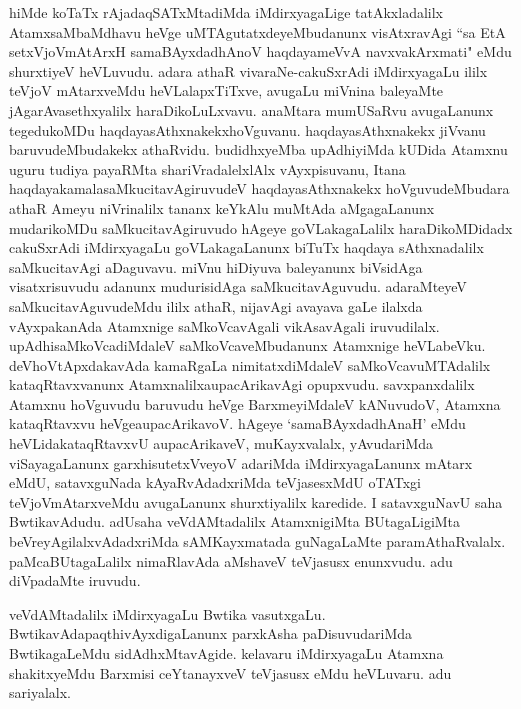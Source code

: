 \begin{artha}
hiMde koTaTx rAjadaqSATxMtadiMda iMdirxyagaLige tatAkxladalilx AtamxsaMbaMdhavu heVge uMTAgutatxdeyeMbudanunx visAtxravAgi ``sa EtA setxVjoVmAtArxH samaBAyxdadhAnoV haqdayameVvA navxvakArxmati" eMdu shurxtiyeV heVLuvudu. adara athaR vivaraNe-cakuSxrAdi iMdirxyagaLu ililx teVjoV mAtarxveMdu heVLalapxTiTxve, avugaLu miVnina baleyaMte jAgarAvasethxyalilx haraDikoLuLxvavu. anaMtara mumUSaRvu avugaLanunx tegedukoMDu haqdayasAthxnakekx\break hoVguvanu. haqdayasAthxnakekx jiVvanu baruvudeMbudakekx athaRvidu. budidhxyeMba upAdhiyiMda kUDida Atamxnu uguru tudiya payaRMta shariVradalelxlAlx vAyxpisuvanu, Itana haqdayakamala\break saMkucitavAgiruvudeV haqdayasAthxnakekx hoVguvudeMbudara athaR Ameyu niVrinalilx tananx keYkAlu muMtAda aMgagaLanunx mudari\-koMDu saMkucitavAgiruvudo hAgeye goVLakagaLalilx haraDikoMDidadx cakuSxrAdi iMdirxyagaLu goVLakagaLanunx biTuTx haqdaya sAthxnadalilx saMkucitavAgi aDaguvavu. miVnu hiDiyuva baleyanunx biVsidAga visatxrisuvudu adanunx mudurisidAga saMkucitavAguvudu. adaraMteyeV saMkucitavAguvudeMdu ililx athaR, nijavAgi avayava gaLe ilalxda vAyxpakanAda Atamxnige saMkoVcavAgali vikAsavAgali iruvudilalx. upAdhisaMkoVcadiMdaleV saMkoVcaveMbudanunx Atamxnige heVLabeVku. deVhoVtApxdakavAda kamaRgaLa nimitatxdiMdaleV saMkoVcavuMTAdalilx kataqRtavxvanunx Atamxnalilx\break aupacArikavAgi opupxvudu. savxpanxdalilx Atamxnu hoVguvudu baruvudu heVge BarxmeyiMdaleV kANuvudoV, Atamxna kataqRtavxvu heVge\break aupacArikavoV. hAgeye `samaBAyxdadhAnaH' eMdu heVLida\break kataqRtavxvU aupacArikaveV, muKayxvalalx, yAvudariMda viSayagaLanunx garxhisutetxVveyoV adariMda iMdirxyagaLanunx mAtarx eMdU, satavxguNada kAyaRvAdadxriMda teVjasesxMdU oTATxgi teVjoVmAtarxveMdu avugaLanunx shurxtiyalilx karedide. I satavxguNavU saha BwtikavAdudu. adUsaha veVdAMtadalilx AtamxnigiMta BUtagaLigiMta beVreyAgilalxvAdadxriMda sAMKayxmatada guNagaLaMte paramAthaRvalalx. paMcaBUtagaLalilx nimaRlavAda aMshaveV teVjasusx enunxvudu. adu diVpadaMte iruvudu. 
\end{artha}

\begin{artha}
veVdAMtadalilx iMdirxyagaLu Bwtika vasutxgaLu. BwtikavAda\break paqthivAyxdigaLanunx parxkAsha paDisuvudariMda BwtikagaLeMdu sidAdhxMtavAgide. kelavaru iMdirxyagaLu Atamxna shakitxyeMdu Barxmisi ceYtanayxveV teVjasusx eMdu heVLuvaru. adu sariyalalx. 
\end{artha}

